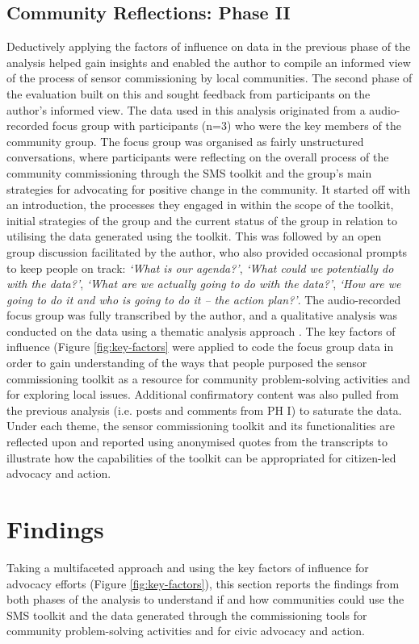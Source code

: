 \subsection[Community Reflections]{Community Reflections: Phase II}
Deductively applying the factors of influence on data in the previous phase of the analysis helped gain insights and enabled the author to compile an informed view of the process of sensor commissioning by local communities. The second phase of the evaluation built on this and sought feedback from participants on the author's informed view. The data used in this analysis originated from a audio-recorded focus group with participants (n=3) who were the key members of the community group. The focus group was organised as fairly unstructured conversations, where participants were reflecting on the overall process of the community commissioning through the SMS toolkit and the group's main strategies for advocating for positive change in the community. It started off with an introduction, the processes they engaged in within the scope of the toolkit, initial strategies of the group and the current status of the group in relation to utilising the data generated using the toolkit. This was followed by an open group discussion facilitated by the author, who also provided occasional prompts to keep people on track: \textit{`What is our agenda?'}, \textit{`What could we potentially do with the data?'}, \textit{`What are we actually going to do with the data?'}, \textit{`How are we going to do it and who is going to do it -- the action plan?'}. The audio-recorded focus group was fully transcribed by the author, and a qualitative analysis was conducted on the data using a thematic analysis approach \citep{braun_using_2006}. The key factors of influence (Figure \ref{fig:key-factors} were applied to code the focus group data in order to gain understanding of the ways that people purposed the sensor commissioning toolkit as a resource for community problem-solving activities and for exploring local issues. Additional confirmatory content was also pulled from the previous analysis (i.e. posts and comments from PH I) to saturate the data. Under each theme, the sensor commissioning toolkit and its functionalities are reflected upon and reported using anonymised quotes from the transcripts to illustrate how the capabilities of the toolkit can be appropriated for citizen-led advocacy and action.

\section{Findings}
Taking a multifaceted approach and using the key factors of influence for advocacy efforts (Figure \ref{fig:key-factors}), this section reports the findings from both phases of the analysis to understand if and how communities could use the SMS toolkit and the data generated through the commissioning tools for community problem-solving activities and for civic advocacy and action.

